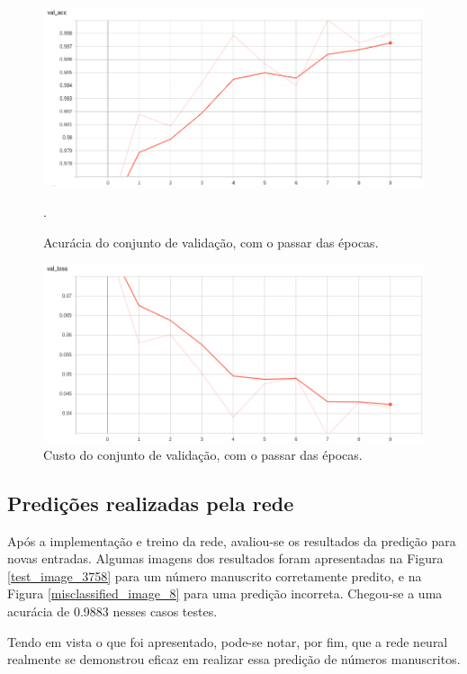 \documentclass[conference]{IEEEtran}
\begin{document}
\begin{figure}[htbp]
\centering
\centerline{\includegraphics[scale=0.25]{imagens/val_acc.png}}
\caption{Acurácia do conjunto de validação, com o passar das épocas.}.
\label{val_acc}
\end{figure}

\begin{figure}[htbp]
\centering
\centerline{\includegraphics[scale=0.25]{imagens/val_loss.png}}
\caption{Custo do conjunto de validação, com o passar das épocas.}
\label{val_loss}
\end{figure}

\subsection{Predições realizadas pela rede}
Após a implementação e treino da rede, avaliou-se os resultados da predição para novas entradas. Algumas imagens dos resultados foram apresentadas na Figura \ref{test_image_3758} para um número manuscrito corretamente predito, e na Figura \ref{misclassified_image_8} para uma predição incorreta. Chegou-se a uma acurácia de 0.9883 nesses casos testes.

Tendo em vista o que foi apresentado, pode-se notar, por fim, que a rede neural realmente se demonstrou eficaz em realizar essa predição de números manuscritos.
\end{document}
